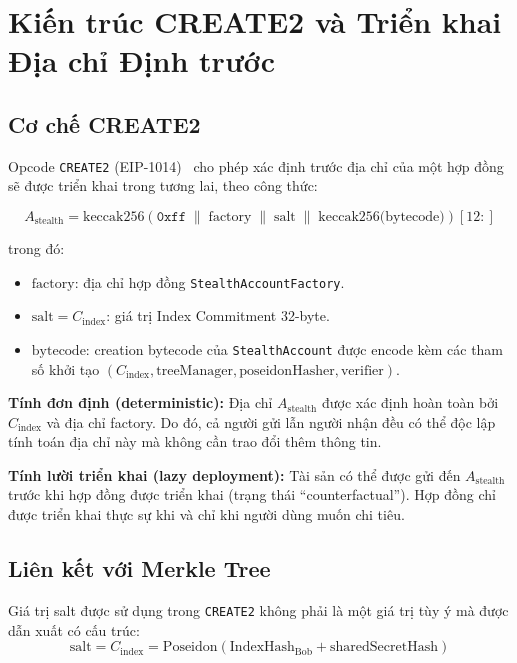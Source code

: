 \documentclass[../DoAn.tex]{subfiles}
\begin{document}
\section{Kiến trúc CREATE2 và Triển khai Địa chỉ Định trước}

\subsection{Cơ chế CREATE2}
\label{subsec:create2}

Opcode \texttt{CREATE2} (EIP-1014)~\cite{eip1014} cho phép xác định trước địa chỉ của một hợp đồng sẽ được triển khai trong tương lai, theo công thức:

\[
    A_{\text{stealth}} = \text{keccak256}\!\left(
        \texttt{0xff} \;\|\; \text{factory} \;\|\; \text{salt} \;\|\; \text{keccak256(bytecode)}
    \right)[12:]
\]

trong đó:
\begin{itemize}
    \item \(\text{factory}\): địa chỉ hợp đồng \texttt{StealthAccountFactory}.
    \item \(\text{salt} = C_{\text{index}}\): giá trị Index Commitment 32-byte.
    \item \(\text{bytecode}\): creation bytecode của \texttt{StealthAccount} được encode kèm các tham số khởi tạo \((C_{\text{index}}, \text{treeManager}, \text{poseidonHasher}, \text{verifier})\).
\end{itemize}

\textbf{Tính đơn định (deterministic):} Địa chỉ \(A_{\text{stealth}}\) được xác định hoàn toàn bởi \(C_{\text{index}}\) và địa chỉ factory. Do đó, cả người gửi lẫn người nhận đều có thể độc lập tính toán địa chỉ này mà không cần trao đổi thêm thông tin.

\textbf{Tính lười triển khai (lazy deployment):} Tài sản có thể được gửi đến \(A_{\text{stealth}}\) trước khi hợp đồng được triển khai (trạng thái ``counterfactual''). Hợp đồng chỉ được triển khai thực sự khi và chỉ khi người dùng muốn chi tiêu.

\subsection{Liên kết với Merkle Tree}
\label{subsec:merkle_link}

Giá trị salt được sử dụng trong \texttt{CREATE2} không phải là một giá trị tùy ý mà được dẫn xuất có cấu trúc:
\[
    \text{salt} = C_{\text{index}} = \text{Poseidon}(\text{IndexHash}_{\text{Bob}} + \text{sharedSecretHash})
\]
\end{document}
